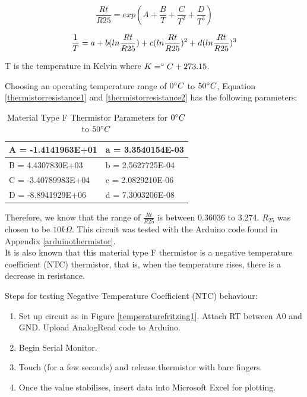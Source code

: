 \begin{equation}
	\frac{Rt}{R25} = exp(A+\frac{B}{T}+\frac{C}{T^2}+\frac{D}{T^3}) 
	\label{thermistorresistance1}
\end{equation}

\begin{equation}
	\frac{1}{T} = a+b(ln\frac{Rt}{R25})+c(ln\frac{Rt}{R25})^2+d(ln\frac{Rt}{R25})^3\\
	\label{thermistorresistance2}
\end{equation}

T is the temperature in Kelvin where $K=\degree C+273.15$. 

Choosing an operating temperature range of $0\degree C$ to $50\degree C$, Equation \ref{thermistorresistance1} and \ref{thermistorresistance2} has the following parameters: 

\begin{table}[H]
	\centering
	\caption{Material Type F Thermistor Parameters for $0\degree C$ to $50\degree C$}
	\label{thermistorparameters}
	\begin{tabular}{|l|l|}
		\hline
		A = -1.4141963E+01  & a = 3.3540154E-03 \\ \hline
		B = 4.4307830E+03   & b = 2.5627725E-04 \\ \hline
		C = -3.40789983E+04 & c = 2.0829210E-06 \\ \hline
		D = -8.8941929E+06  & d = 7.3003206E-08 \\ \hline
	\end{tabular}
\end{table}

Therefore, we know that the range of $\frac{Rt}{R25}$ is between 0.36036 to 3.274. $R_{25}$ was chosen to be $10k\Omega$. This circuit was tested with the Arduino code found in Appendix \ref{arduinothermistor}. \\

It is also known that this material type F thermistor is a negative temperature coefficient (NTC) thermistor, that is, when the temperature rises, there is a decrease in resistance. 

Steps for testing Negative Temperature Coefficient (NTC) behaviour: 
\begin{enumerate}
	\item Set up circuit as in Figure \ref{temperaturefritzing1}. Attach RT between A0 and GND. Upload AnalogRead code to Arduino. 
	\item Begin Serial Monitor.
	\item Touch (for a few seconds) and release thermistor with bare fingers. 
	\item Once the value stabilises, insert data into Microsoft Excel for plotting. 
\end{enumerate}

